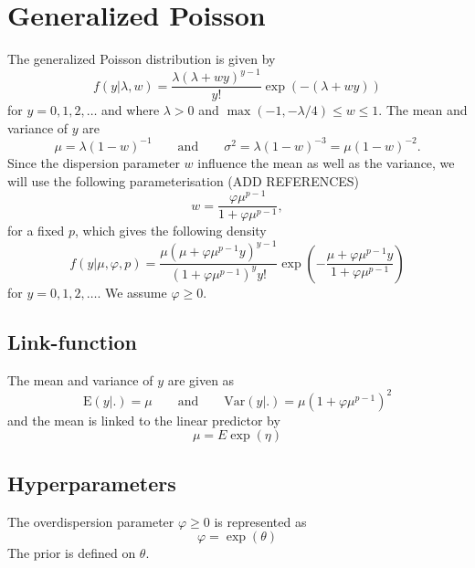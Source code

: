 \documentclass[a4paper,11pt]{article}
\begin{document}
\section*{Generalized Poisson}

The generalized Poisson distribution is given by
\begin{displaymath}
    f(y|\lambda,w) = \frac{\lambda(\lambda+wy)^{y-1}}{y!}
    \exp(-(\lambda+wy))
\end{displaymath}
for $y=0, 1, 2, \ldots$ and where $\lambda>0$ and
$\max(-1,-\lambda/4)\leq w\leq 1$. The mean and variance of $y$ are
\begin{displaymath}
    \mu =\lambda(1-w)^{-1} \qquad\text{and}\qquad
    \sigma^{2} = \lambda(1-w)^{-3}= \mu(1-w)^{-2}.
\end{displaymath}
Since the dispersion parameter $w$ influence the mean as well as the
variance, we will use the following parameterisation (ADD REFERENCES)
\begin{displaymath}
    w=\frac{\varphi\mu^{p-1}}{1+\varphi\mu^{p-1}}, 
\end{displaymath}
for a fixed $p$, which gives the following density
\begin{displaymath} 
    f(y|\mu,\varphi,p) =\frac{ \mu(\mu+\varphi\mu^{p-1} y)^{y-1}}%
    {(1+\varphi\mu^{p-1})^{y}y!}
    \exp\left(-\frac{\mu+\varphi\mu^{p-1} y}{1+\varphi\mu^{p-1}}\right)
\end{displaymath}
for $y=0, 1, 2, \ldots$. We assume $\varphi \ge 0$.

\subsection*{Link-function}

The mean and variance of $y$ are given as
\begin{displaymath}
    \text{E}(y|.) = \mu \qquad\text{and}\qquad
    \text{Var}(y|.) = \mu\left(1+\varphi\mu^{p-1}\right)^{2}
\end{displaymath}
and the mean is linked to the linear predictor by
\begin{displaymath}
    \mu = E \exp(\eta)
\end{displaymath}

\subsection*{Hyperparameters}
The overdispersion parameter $\varphi \ge 0$ is represented as
\begin{displaymath}
    \varphi = \exp(\theta) 
\end{displaymath}
The prior is defined on $\theta$. 
\end{document}
